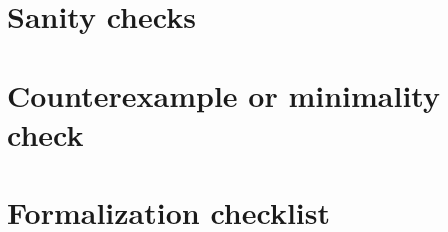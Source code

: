 \documentclass[11pt]{article}
\theoremstyle{definition}
\theoremstyle{plain}
\theoremstyle{remark}
\begin{document}
\section{Sanity checks}

\section{Counterexample or minimality check}

\section{Formalization checklist}
\end{document}
